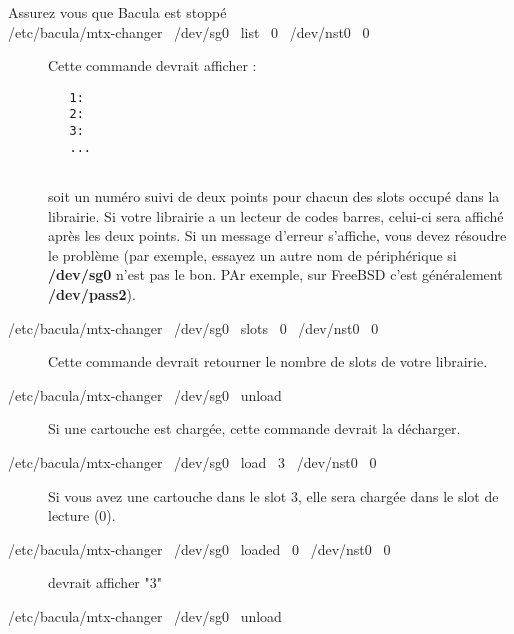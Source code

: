 \begin{description}

\item [Assurez vous que Bacula est stopp\'e]

\item [/etc/bacula/mtx-changer \ /dev/sg0 \ list \ 0 \ /dev/nst0 \ 0]

Cette commande devrait afficher :  

\footnotesize
\begin{verbatim}
   1:
   2:
   3:
   ...
   
\end{verbatim}
\normalsize

soit un num\'ero suivi de deux points pour chacun des slots occup\'e dans la librairie. 
Si votre librairie a un lecteur de codes barres, celui-ci sera affich\'e apr\`es les 
deux points. Si un message d'erreur s'affiche, vous devez r\'esoudre le probl\`eme 
(par exemple, essayez un autre nom de p\'eriph\'erique si {\bf /dev/sg0} n'est pas 
le bon. PAr exemple, sur FreeBSD c'est g\'en\'eralement {\bf /dev/pass2}).

\item [/etc/bacula/mtx-changer \ /dev/sg0 \ slots \ 0 \ /dev/nst0 \ 0]

Cette commande devrait retourner le nombre de slots de votre librairie.

\item [/etc/bacula/mtx-changer \ /dev/sg0 \ unload \ ]

Si une cartouche est charg\'ee, cette commande devrait la d\'echarger.

\item [/etc/bacula/mtx-changer \ /dev/sg0 \ load \ 3 \ /dev/nst0 \ 0 ]

Si vous avez une cartouche dans le slot 3, elle sera charg\'ee dans le slot 
de lecture (0).

\item [/etc/bacula/mtx-changer \ /dev/sg0 \ loaded \ 0 \ /dev/nst0 \ 0]

devrait afficher "3"

\item [/etc/bacula/mtx-changer \ /dev/sg0 \ unload]
\end{description}

